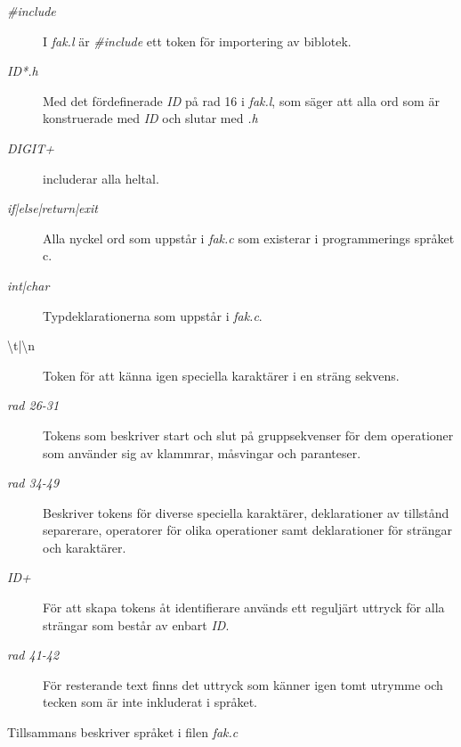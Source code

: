\begin{description}

\item[\textit{\#include}] I \textit{fak.l} är \textit{\#include} ett token för importering av biblotek. 

\item[\textit{{ID}*.h}] Med det fördefinerade \textit{ID} på rad 16 i
\textit{fak.l}, som säger att alla ord som är konstruerade med \textit{ID} och slutar
med \textit{.h}

\item[\textit{{DIGIT}+}] includerar alla heltal.

\item[\textit{if|else|return|exit}] Alla nyckel ord som uppstår i \textit{fak.c }
som existerar i programmerings språket c.

\item[\textit{int|char}] Typdeklarationerna som uppstår i \textit{fak.c}. 

\item[\textbackslash t|\textbackslash n] Token för att känna igen speciella karaktärer i en sträng sekvens.

\item[\textit{rad 26-31}] Tokens som beskriver start och slut på gruppsekvenser för dem
operationer som använder sig av klammrar, måsvingar och paranteser.

\item[\textit{rad 34-49}] Beskriver tokens för diverse speciella karaktärer, deklarationer av
tillstånd separerare, operatorer för olika operationer samt deklarationer för strängar och
karaktärer.

\item[\textit{{ID}+}] För att skapa tokens åt identifierare används ett reguljärt uttryck för alla strängar som
består av enbart \textit{ID}.

\item[\textit{rad 41-42}] För resterande text finns det uttryck som känner igen tomt utrymme och
tecken som är inte inkluderat i språket.

\end{description}

 Tillsammans beskriver språket i filen \textit{fak.c}

